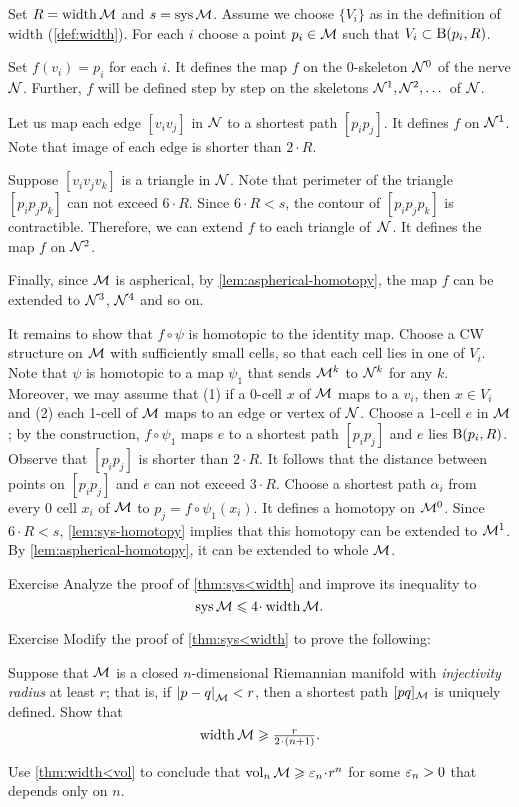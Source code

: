 Set $R=\operatorname{\rm width}\nolimits \mathcal{M}$ and $s=\mathop{\rm sys}\nolimits\mathcal{M}$.
Assume we choose $\{V_i\}$ as in the definition of width (\ref{def:width}).
For each $i$ choose a point $p_i\in \mathcal{M}$ such that $V_i\subset \mathrm{B}{}(p_i,R)$.

Set $f(v_i)=p_i$ for each $i$.
It defines the map $f$ on the 0-skeleton $\mathcal{N}^0$ of the nerve $\mathcal{N}$.
Further, $f$ will be defined step by step on the skeletons $\mathcal{N}^1,\mathcal{N}^2, \dots$ of $\mathcal{N}$.

Let us map each edge $[v_iv_j]$ in $\mathcal{N}$ to a shortest path $[p_ip_j]$.
It defines $f$ on $\mathcal{N}^1$.
Note that image of each edge is shorter than $2\cdot R$.

Suppose $[v_iv_jv_k]$ is a triangle in $\mathcal{N}$.
Note that perimeter of the triangle $[p_ip_jp_k]$ can not exceed $6\cdot R$.
Since $6\cdot R<s$, the contour of $[p_ip_jp_k]$ is contractible.
Therefore, we can extend $f$ to each triangle of~$\mathcal{N}$.
It defines the map $f$ on $\mathcal{N}^2$.

Finally, since $\mathcal{M}$ is aspherical, by \ref{lem:aspherical-homotopy}, the map $f$ can be extended to $\mathcal{N}^3$, $\mathcal{N}^4$ and so on.

It remains to show that $f\circ\psi$ is homotopic to the identity map.
Choose a CW structure on $\mathcal{M}$ with sufficiently small cells, so that each cell lies in one of $V_i$.
Note that $\psi$ is homotopic to a map $\psi_1$ that sends $\mathcal{M}^k$ to $\mathcal{N}^k$ for any $k$.
Moreover, we may assume that (1) if a 0-cell $x$ of $\mathcal{M}$ maps to a $v_i$, then $x\in V_i$ and (2) each 1-cell  of $\mathcal{M}$ maps to an edge or vertex of $\mathcal{N}$.
Choose a 1-cell $e$ in $\mathcal{M}$; by the construction, $f\circ\psi_1$ maps $e$ to a shortest path $[p_ip_j]$ and $e$ lies $\mathrm{B}{}(p_i,R)$.
Observe that $[p_ip_j]$ is shorter than $2\cdot R$.
It follows that the distance between points on $[p_ip_j]$ and $e$ can not exceed $3\cdot R$.
Choose a shortest path $\alpha_i$ from every 0 cell $x_i$  of $\mathcal{M}$ to $p_j=f\circ\psi_1(x_i)$.
It defines a homotopy on $\mathcal{M}^0$.
Since $6\cdot R<s$, \ref{lem:sys-homotopy} implies that this homotopy can be extended to $\mathcal{M}^1$.
By \ref{lem:aspherical-homotopy}, it can be extended to whole $\mathcal{M}$.
\qeds

\begin{thm}{Exercise}\label{ex:sys<width}
Analyze the proof of \ref{thm:sys<width} and improve its inequality to 
 \[\sys\spc{M}\le 4 \cdot \width \spc{M}.\]
\end{thm}

\begin{thm}{Exercise}\label{ex:fillrad-inj}
Modify the proof of \ref{thm:sys<width} to prove the following:

Suppose that $\mathcal{M}$ is a closed $n$-dimensional Riemannian manifold with \emph{injectivity radius} at least $r$; that is, if $\dist{p}{q}{\spc{M}}<r$, then a shortest path $[pq]_{\mathcal{M}}$ is uniquely defined.
Show that
\[\width\spc{M}\ge \tfrac{r}{2\cdot(n+1)}.\]

Use \ref{thm:width<vol} to conclude that $\vol_n\spc{M}\ge \eps_n \cdot r^n$
for some $\varepsilon_n>0$ that depends only on $n$.
\end{thm} 

